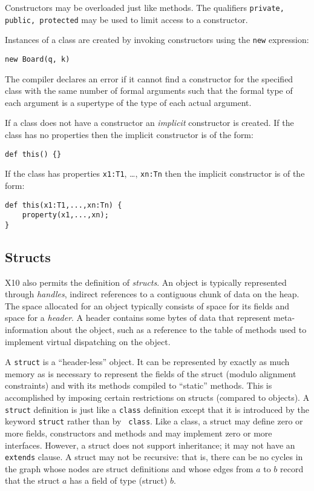 \noindent Constructors may be overloaded just like methods.  The
qualifiers {\tt private, public, protected} may be used to limit access
to a constructor.

Instances of a class are created by invoking constructors using the
{\tt new} expression:

{\footnotesize
\begin{verbatim}
new Board(q, k)
\end{verbatim}
}

The compiler declares an error if it cannot find a constructor for the
specified class with the same number of formal arguments such that the
formal type of each argument is a supertype of the type of each actual
argument.

If a class does not have a constructor an {\em implicit} constructor
is created. If the class has no properties then the implicit
constructor is of the form: 
{\footnotesize
\begin{verbatim}
def this() {}
\end{verbatim}}

If the class has properties {\tt x1:T1}, \ldots, {\tt xn:Tn} then the
implicit constructor is of the form:
{\footnotesize
\begin{verbatim}
def this(x1:T1,...,xn:Tn) {
    property(x1,...,xn);
}
\end{verbatim}}

\subsection{Structs}\label{sec:x10-basic-structs}

X10 also permits the definition of {\em structs}. An object is
typically represented through {\em handles}, indirect references to a
contiguous chunk of data on the heap. The space allocated
for an object typically consists of space for its fields and space for
a {\em header}. A header contains some bytes of data that represent
meta-information about the object, such as a reference to the table of
methods used to implement virtual dispatching on the object. 

A {\tt struct} is a ``header-less'' object. It can be represented by
exactly as much memory as is necessary to represent the fields of the
struct (modulo alignment constraints) and with its methods compiled to
``static'' methods.  This is accomplished by imposing certain
restrictions on structs (compared to objects).  A {\tt struct}
definition is just like a {\tt class} definition except that it is
introduced by the keyword {\tt struct} rather than by {\tt 
  class}.  Like a class, a struct may define zero or more fields,
constructors and methods and may implement zero or more
interfaces. However, a struct does not support inheritance; it may not
have an {\tt extends} clause. A struct may not be recursive: that
is, there can be no cycles in the graph whose nodes are struct
definitions and whose edges from $a$ to $b$ record that the struct $a$
has a field of type (struct) $b$.  


